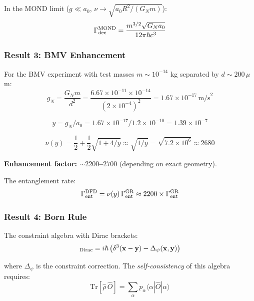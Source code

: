 \documentclass[11pt,a4paper]{article}
\begin{document}
In the MOND limit ($g \ll a_0$, $\nu \to \sqrt{a_0 R^2/(G_N m)}$):
\begin{equation}
\Gamma_{\rm dec}^{\rm MOND} = \frac{m^{3/2}\sqrt{G_N a_0}}{12\pi\hbar c^3}
\end{equation}

\subsubsection{Result 3: BMV Enhancement}

For the BMV experiment with test masses $m \sim 10^{-14}$ kg separated by $d \sim 200\,\mu$m:
\begin{equation}
g_N = \frac{G_N m}{d^2} = \frac{6.67\times10^{-11}\times10^{-14}}{(2\times10^{-4})^2} = 1.67\times10^{-17}\,\text{m/s}^2
\end{equation}

\begin{equation}
y = g_N/a_0 = 1.67\times10^{-17}/1.2\times10^{-10} = 1.39\times10^{-7}
\end{equation}

\begin{equation}
\nu(y) = \frac{1}{2} + \frac{1}{2}\sqrt{1 + 4/y} \approx \sqrt{1/y} = \sqrt{7.2\times10^{6}} \approx 2680
\end{equation}

\textbf{Enhancement factor: $\sim 2200$--$2700$} (depending on exact geometry).

The entanglement rate:
\begin{equation}
\Gamma_{\rm ent}^{\rm DFD} = \nu(y)\,\Gamma_{\rm ent}^{\rm GR} \approx 2200 \times \Gamma_{\rm ent}^{\rm GR}
\end{equation}

\subsubsection{Result 4: Born Rule}

The constraint algebra with Dirac brackets:
\begin{equation}
[\hat{\psi}(\mathbf{x}), \hat{\pi}_\psi(\mathbf{y})]_{\rm Dirac} = i\hbar\left(\delta^3(\mathbf{x}-\mathbf{y}) - \Delta_\psi(\mathbf{x},\mathbf{y})\right)
\end{equation}

where $\Delta_\psi$ is the constraint correction. The \emph{self-consistency} of this algebra requires:
\begin{equation}
\text{Tr}[\hat{\rho}\,\hat{O}] = \sum_\alpha p_\alpha\langle\alpha|\hat{O}|\alpha\rangle
\end{equation}
\end{document}
